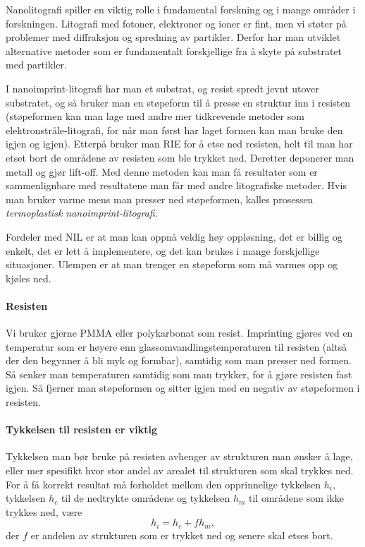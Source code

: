Nanolitografi spiller en viktig rolle i fundamental forskning og i mange områder i forskningen. Litografi med fotoner, elektroner og ioner er fint, men vi støter på problemer med diffraksjon og spredning av partikler. Derfor har man utviklet alternative metoder som er fundamentalt forskjellige fra å skyte på substratet med partikler.

I nanoimprint-litografi har man et substrat, og resist spredt jevnt utover substratet, og så bruker man en støpeform til å presse en struktur inn i resisten (støpeformen kan man lage med andre mer tidkrevende metoder som elektronstråle-litografi, for når man først har laget formen kan man bruke den igjen og igjen). Etterpå bruker man RIE for å etse ned resisten, helt til man har etset bort de områdene av resisten som ble trykket ned. Deretter deponerer man metall og gjør lift-off. Med denne metoden kan man få resultater som er sammenlignbare med resultatene man får med andre litografiske metoder. Hvis man bruker varme mens man presser ned støpeformen, kalles prosessen \emph{termoplastisk nanoimprint-litografi}.

Fordeler med NIL er at man kan oppnå veldig høy oppløsning, det er billig og enkelt, det er lett å implementere, og det kan brukes i mange forskjellige situasjoner. Ulempen er at man trenger en støpeform som må varmes opp og kjøles ned.

\paragraph{Resisten} Vi bruker gjerne PMMA eller polykarbonat som resist. Imprinting gjøres ved en temperatur som er høyere enn glassomvandlingstemperaturen til resisten (altså der den begynner å bli myk og formbar), samtidig som man presser ned formen. Så senker man temperaturen samtidig som man trykker, for å gjøre resisten fast igjen. Så fjerner man støpeformen og sitter igjen med en negativ av støpeformen i resisten.

\paragraph{Tykkelsen til resisten er viktig} Tykkelsen man bør bruke på resisten avhenger av strukturen man ønsker å lage, eller mer spesifikt hvor stor andel av arealet til strukturen som skal trykkes ned. For å få korrekt resultat må forholdet mellom den opprinnelige tykkelsen $h_i$, tykkelsen $h_c$ til de nedtrykte områdene og tykkelsen $h_m$ til områdene som ikke trykkes ned, være
\begin{equation}
	h_i = h_c + fh_m,
\end{equation}
der $f$ er andelen av strukturen som er trykket ned og senere skal etses bort.


